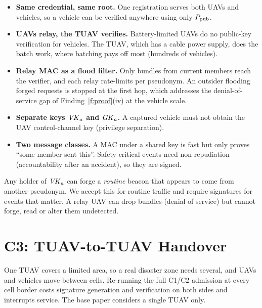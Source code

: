 \begin{whybox}
\begin{itemize}[leftmargin=*]
  \item \textbf{Same credential, same root.} One registration serves both UAVs and vehicles, so a vehicle can be verified anywhere using only $P_{\mathrm{pub}}$.
  \item \textbf{UAVs relay, the TUAV verifies.} Battery-limited UAVs do no public-key verification for vehicles. The TUAV, which has a cable power supply, does the batch work, where batching pays off most (hundreds of vehicles).
  \item \textbf{Relay MAC as a flood filter.} Only bundles from current members reach the verifier, and each relay rate-limits per pseudonym. An outsider flooding forged requests is
        stopped at the first hop, which addresses the denial-of-service gap of Finding~\ref{f:proof}(iv) at the vehicle scale.
  \item \textbf{Separate keys $\mathit{VK}_a$ and $\mathit{GK}_a$.} A captured vehicle must not obtain the UAV control-channel key (privilege separation).
  \item \textbf{Two message classes.} A MAC under a shared key is fast but only proves ``some member sent this''. Safety-critical events need
        non-repudiation (accountability after an accident), so they are signed.
\end{itemize}
\end{whybox}
\begin{limitbox}
Any holder of $\mathit{VK}_a$ can forge a \emph{routine} beacon that appears to come from another pseudonym. We accept this for routine traffic and require signatures
for events that matter. A relay UAV can drop bundles (denial of service) but cannot forge, read or alter them undetected.
\end{limitbox}

\section{C3: TUAV-to-TUAV Handover}\label{sec:c3}
One TUAV covers a limited area, so a real disaster zone needs several, and UAVs and vehicles move between cells. Re-running the full C1/C2
admission at every cell border costs signature generation and verification on both sides and interrupts service. The base paper considers a single TUAV only.

